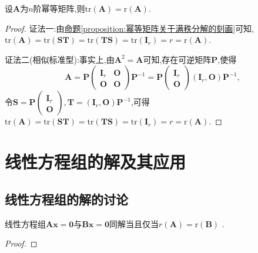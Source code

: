 \documentclass[lang=cn,newtx,10pt,scheme=chinese]{elegantbook}
\begin{document}
\begin{corollary}[幂等矩阵的迹和秩相等]\label{corollary:幂等矩阵的迹和秩相等}
设\(\boldsymbol{A}\)为\(n\)阶幂等矩阵,则\(\mathrm{tr}(\boldsymbol{A})=\mathrm{r}(\boldsymbol{A})\).
\end{corollary}
\begin{proof}
{\color{blue}证法一:}由\hyperref[proposition:幂等矩阵关于满秩分解的刻画]{命题\ref{proposition:幂等矩阵关于满秩分解的刻画}}可知,\(\mathrm{tr}(\boldsymbol{A})=\mathrm{tr}(\boldsymbol{S}\boldsymbol{T})=\mathrm{tr}(\boldsymbol{T}\boldsymbol{S})=\mathrm{tr}(\boldsymbol{I}_r)=r=\mathrm{r}(\boldsymbol{A})\).

{\color{blue}证法二(相似标准型):}事实上,由\(\boldsymbol{A}^2=\boldsymbol{A}\)可知,存在可逆矩阵\(\boldsymbol{P}\),使得
\[
\boldsymbol{A}=\boldsymbol{P}\begin{pmatrix}
\boldsymbol{I}_r&\boldsymbol{O}\\
\boldsymbol{O}&\boldsymbol{O}
\end{pmatrix}\boldsymbol{P}^{-1}=\boldsymbol{P}\begin{pmatrix}
\boldsymbol{I}_r\\
\boldsymbol{O}
\end{pmatrix}(\boldsymbol{I}_r,\boldsymbol{O})\boldsymbol{P}^{-1},
\]
令\(\boldsymbol{S}=\boldsymbol{P}\begin{pmatrix}
\boldsymbol{I}_r\\
\boldsymbol{O}
\end{pmatrix},\boldsymbol{T}=(\boldsymbol{I}_r,\boldsymbol{O})\boldsymbol{P}^{-1}\),可得\(\mathrm{tr}(\boldsymbol{A})=\mathrm{tr}(\boldsymbol{S}\boldsymbol{T})=\mathrm{tr}(\boldsymbol{T}\boldsymbol{S})=\mathrm{tr}(\boldsymbol{I}_r)=r=\mathrm{r}(\boldsymbol{A})\).
\end{proof}

\section{线性方程组的解及其应用}

\subsection{线性方程组的解的讨论}

\begin{proposition}\label{proposition:线性方程组同解系数矩阵秩相同}
线性方程组$\boldsymbol{Ax}=\mathbf{0}$与$\boldsymbol{Bx}=\mathbf{0}$同解当且仅当$r\left( \boldsymbol{A} \right) =\mathrm{r}\left( \boldsymbol{B} \right)$ .
\end{proposition}
\begin{proof}

\end{proof}
\end{document}
